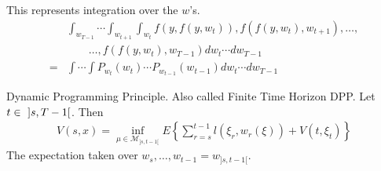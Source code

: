 This represents integration over the $w$'s.
\begin{align*}
&\int_{w_{T-1}}\cdots\int_{w_{t+1}}\int_{w_t}f(y,f(y,w_t)),f(f(y,w_t),w_{t+1}),\ldots, \\
&\qquad \ldots,f(f(y,w_t),w_{T-1})dw_t\cdots dw_{T-1} \\
= &\int\cdots\int P_{w_t}(w_t)\cdots P_{w_{t-1}}(w_{t-1})dw_t\cdots dw_{T-1}
\end{align*}

\begin{theorem}{Dynamic Programming Principle.}
Also called Finite Time Horizon DPP\@.
Let $t\in~\interval[open]{s}{T-1}$.
Then
\begin{align}
\label{eq:dpp}
V(s,x) = \inf_{\mu\in\mathcal{M}_{]s,t-1[}}E\left\lbrace\sum_{r=s}^{t-1}l(\xi_r,w_r(\xi)) + V(t,\xi_t)\right\rbrace %
\end{align}
The expectation taken over $w_s,\ldots,w_{t-1} = w_{]s,t-1[}$. %
\end{theorem}

